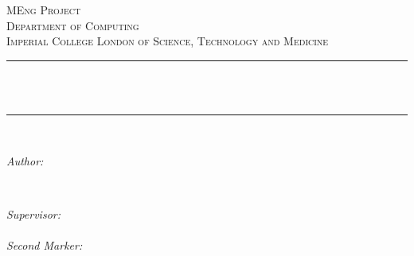 \begin{titlepage}

\newcommand{\HRule}{\rule{\linewidth}{0.5mm}} %



\center %


\textsc{\Large MEng Project}\\[1.25cm] 
\textsc{\large Department of Computing}\\[0.5cm] 
\textsc{\normalsize Imperial College London of Science, Technology and Medicine}\\[0.5cm] 


\HRule \\[0.4cm]
{ \huge \bfseries \reporttitle}\\ %
\HRule \\[1.5cm]

 

\begin{minipage}{0.4\textwidth}
\begin{flushleft} \large
\emph{Author:}\\
\reportauthor %
\end{flushleft}
\end{minipage}
~
\begin{minipage}{0.4\textwidth}
\begin{flushright} \large
\emph{Supervisor:} \\
\supervisor %
\\[1em]
\emph{Second Marker:} \\
\secondmarker %
\end{flushright}
\end{minipage}\\[4cm]



\end{titlepage}
